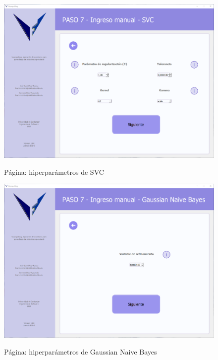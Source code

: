 \begin{figure}[H]
    \centering
    \caption{Página: hiperparámetros de SVC}
    \includegraphics[width=\textwidth]{views/svc.png}
    \label{fig:svc}
\end{figure}

\begin{figure}[H]
    \centering
    \caption{Página: hiperparámetros de Gaussian Naive Bayes}
    \includegraphics[width=\textwidth]{views/gaussian_naive_bayes.png}
    \label{fig:gassianNB}
\end{figure}

